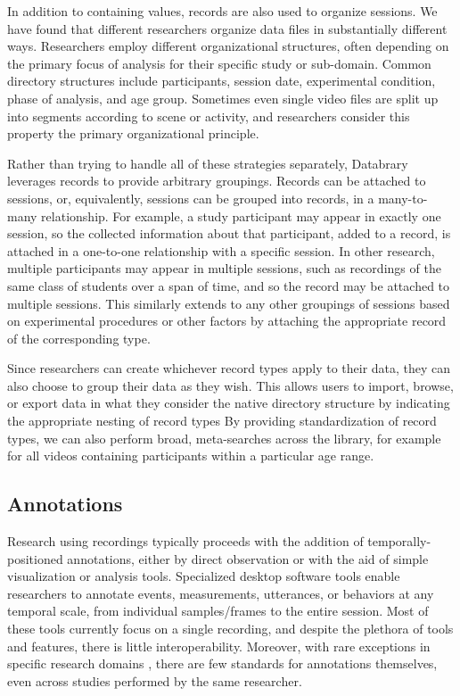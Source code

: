 \documentclass{sig-alternate}
\begin{document}
In addition to containing values, records are also used to organize sessions.
We have found that different researchers organize data files in substantially different ways.
Researchers employ different organizational structures, often depending on the primary focus of analysis for their specific study or sub-domain.
Common directory structures include participants, session date, experimental condition, phase of analysis, and age group.
Sometimes even single video files are split up into segments according to scene or activity, and researchers consider this property the primary organizational principle.

Rather than trying to handle all of these strategies separately, Databrary leverages records to provide arbitrary groupings.
Records can be attached to sessions, or, equivalently, sessions can be grouped into records, in a many-to-many relationship.
For example, a study participant may appear in exactly one session, so the collected information about that participant, added to a record, is attached in a one-to-one relationship with a specific session.
In other research, multiple participants may appear in multiple sessions, such as recordings of the same class of students over a span of time, and so the record may be attached to multiple sessions.
This similarly extends to any other groupings of sessions based on experimental procedures or other factors by attaching the appropriate record of the corresponding type.

Since researchers can create whichever record types apply to their data, they can also choose to group their data as they wish.
This allows users to import, browse, or export data in what they consider the native directory structure by indicating the appropriate nesting of record types
By providing standardization of record types, we can also perform broad, meta-searches across the library, for example for all videos containing participants within a particular age range.

\subsection{Annotations}

Research using recordings typically proceeds with the addition of temporally-positioned annotations, either by direct observation or with the aid of simple visualization or analysis tools.
Specialized desktop software tools enable researchers to annotate events, measurements, utterances, or behaviors at any temporal scale, from individual samples/frames to the entire session.
Most of these tools currently focus on a single recording, and despite the plethora of tools and features, there is little interoperability.
Moreover, with rare exceptions in specific research domains \cite{MacWhinney2001}, there are few standards for annotations themselves, even across studies performed by the same researcher. 
\end{document}
